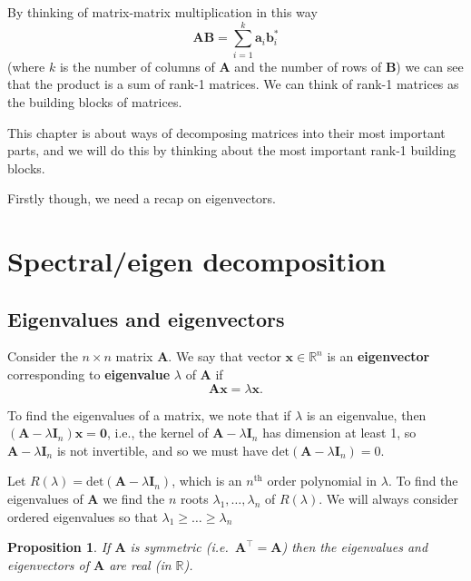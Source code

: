 \documentclass[]{book}
\newtheorem{proposition}{Proposition}[chapter]
\theoremstyle{definition}
\theoremstyle{definition}
\theoremstyle{definition}
\theoremstyle{remark}
\begin{document}
By thinking of matrix-matrix multiplication in this way
\[\boldsymbol A\boldsymbol B=\sum_{i=1}^k \boldsymbol a_i \boldsymbol b_i^*\]
(where \(k\) is the number of columns of \(\boldsymbol A\) and the number of rows of \(\boldsymbol B\))
we can see that the product is a sum of rank-1 matrices.
We can think of rank-1 matrices as the building blocks of matrices.

This chapter is about ways of decomposing matrices into their most important parts, and we will do this by thinking about the most important rank-1 building blocks.

Firstly though, we need a recap on eigenvectors.

\hypertarget{spectraleigen-decomposition}{%
\section{Spectral/eigen decomposition}\label{spectraleigen-decomposition}}

\hypertarget{eigenvalues-and-eigenvectors}{%
\subsection{Eigenvalues and eigenvectors}\label{eigenvalues-and-eigenvectors}}

Consider the \(n\times n\) matrix \(\boldsymbol A\).
We say that
vector \(\boldsymbol x\in \mathbb{R}^n\) is an \textbf{eigenvector} corresponding to \textbf{eigenvalue} \(\lambda\) of \(\boldsymbol A\) if
\[{\mathbf A} {\mathbf x} = \lambda {\mathbf x}.\]

To find the eigenvalues of a matrix, we note that if \(\lambda\) is an eigenvalue, then \((\boldsymbol A-\lambda \mathbf I_n)\boldsymbol x=\boldsymbol 0\), i.e., the kernel of \(\boldsymbol A-\lambda \mathbf I_n\) has dimension at least 1, so \(\boldsymbol A-\lambda \mathbf I_n\) is not invertible, and so we must have \(\text{det}({\mathbf A}-\lambda {\mathbf I}_n)=0\).

Let \(R(\lambda )=\text{det}({\mathbf A}-\lambda {\mathbf I}_n)\), which is an \(n^{\text{th}}\) order polynomial in \(\lambda\). To find the eigenvalues of \(\boldsymbol A\) we find the \(n\) roots \(\lambda _1, \dots , \lambda _n\) of \(R(\lambda )\). We will always consider ordered eigenvalues so that \(\lambda _1\geq \dots \geq \lambda _n\)

\begin{proposition}
\protect\hypertarget{prp:unnamed-chunk-2}{}{\label{prp:unnamed-chunk-2} }If \(\mathbf A\) is symmetric (i.e.~\({\mathbf A}^\top ={\mathbf A}\)) then the
eigenvalues and eigenvectors of \(\mathbf A\) are \emph{real} (in \(\mathbb{R}\)).
\end{proposition}
\end{document}
